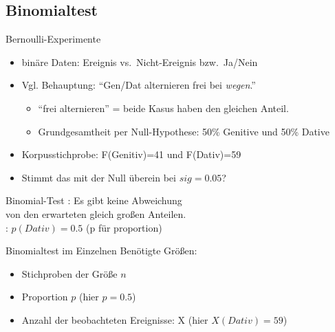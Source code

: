 \subsection{Binomialtest}

\begin{frame}
  {Bernoulli-Experimente}
  \begin{itemize}[<+->]
    \item binäre Daten: Ereignis vs.\ Nicht-Ereignis bzw.\ Ja\slash Nein
      \vspace{0.5cm}
    \item Vgl. Behauptung: "`Gen/Dat alternieren frei bei \textit{wegen}."'
      \begin{itemize}[<+->]
	\item "`frei alternieren"' = beide Kasus haben den gleichen Anteil.
	\item Grundgesamtheit per Null-Hypothese: \alert{50\% Genitive} und \alert{50\% Dative}
      \end{itemize}
      \vspace{0.5cm}
    \item Korpusstichprobe: \alert{F(Genitiv)=41} und \alert{F(Dativ)=59}
    \item Stimmt das mit der Null überein bei $sig=0.05$?
  \end{itemize}
\end{frame}

\begin{frame}
  {Binomial-Test}  
  \pause
  \Large
  \Null: Es gibt keine Abweichung\\
  von den erwarteten gleich großen Anteilen.\\[\baselineskip]
  \pause
  \alert{\Null: $p(Dativ)=0.5$} (p für proportion)
\end{frame}

\begin{frame}
  {Binomialtest im Einzelnen}
  Benötigte Größen:

  \begin{itemize}[<+->]
    \item Stichproben der Größe \alert{$n$}
    \item Proportion \alert{$p$} (hier $p=0.5$)
    \item Anzahl der beobachteten Ereignisse: \alert{X} (hier $X(Dativ)=59$)
  \end{itemize}
\end{frame}

